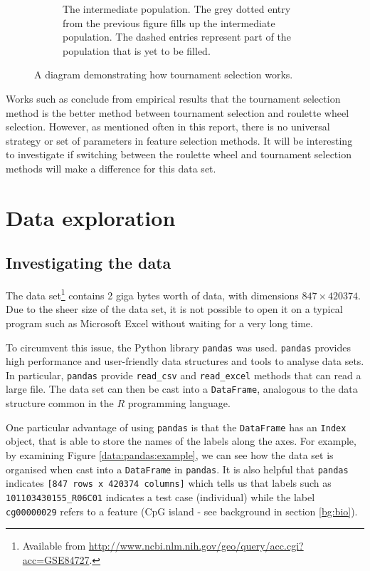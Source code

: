 \documentclass[12pt, twoside, a4paper]{report}
\begin{document}
\begin{figure}
\begin{subfigure}[b]{\textwidth}
\begin{tikzpicture}[
  node distance=+1em and +0pt,
  outer xsep=+0pt,
  outer ysep=+0pt,
]
\end{tikzpicture}
\caption{The intermediate population. The grey dotted entry from the previous figure fills up the intermediate population. The dashed entries represent part of the population that is yet to be filled.}
\label{bg:ga:tour_b}
\end{subfigure}

\caption{A diagram demonstrating how tournament selection works.}
\label{bg:ga:tour}
\end{figure}



Works such as \cite{RefWorks:245, RefWorks:246} conclude from empirical results that the tournament selection method is the better method between tournament selection and roulette wheel selection. However, as mentioned often in this report, there is no universal strategy or set of parameters in feature selection methods. It will be interesting to investigate if switching between the roulette wheel and tournament selection methods will make a difference for this data set.


\chapter{Data exploration}
\section{Investigating the data} \label{data:understanding}

The data set\footnote{Available from \url{http://www.ncbi.nlm.nih.gov/geo/query/acc.cgi?acc=GSE84727}.} contains 2 giga bytes worth of data, with dimensions $847 \times 420374$. Due to the sheer size of the data set, it is not possible to open it on a typical program such as Microsoft Excel without waiting for a very long time.

To circumvent this issue, the Python library \texttt{pandas} \cite{RefWorks:213} was used. \texttt{pandas} provides high performance and user-friendly data structures and tools to analyse data sets. In particular, \texttt{pandas} provide \texttt{read\_csv} and \texttt{read\_excel} methods that can read a large file. The data set can then be cast into a \texttt{DataFrame}, analogous to the data structure common in the $R$ programming language.

One particular advantage of using \texttt{pandas} is that the \texttt{DataFrame} has an \texttt{Index} object, that is able to store the names of the labels along the axes. For example, by examining Figure \ref{data:pandas:example}, we can see how the data set is organised when cast into a \texttt{DataFrame} in \texttt{pandas}. It is also helpful that \texttt{pandas} indicates \texttt{[847 rows x 420374 columns]} which tells us that labels such as \texttt{101103430155\_R06C01} indicates a test case (individual) while the label \texttt{cg00000029} refers to a feature (CpG island - see background in section \ref{bg:bio}).
\end{document}
